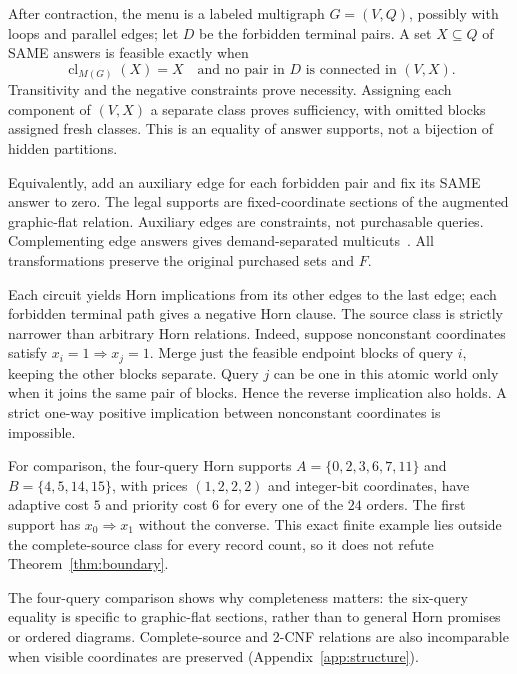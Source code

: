 \documentclass[pdflatex,sn-mathphys-num]{sn-jnl}
\newcommand{\cl}{\operatorname{cl}}
\theoremstyle{thmstyleone}
\theoremstyle{thmstylethree}
\theoremstyle{thmstyletwo}
\begin{document}
After contraction, the menu is a labeled multigraph $G=(V,Q)$, possibly with loops and parallel edges; let $D$ be the forbidden terminal pairs. A set $X\subseteq Q$ of SAME answers is feasible exactly when
\begin{equation}\label{eq:flat}
 \cl_{M(G)}(X)=X
 \quad\text{and no pair in }D\text{ is connected in }(V,X).
\end{equation}
Transitivity and the negative constraints prove necessity. Assigning each component of $(V,X)$ a separate class proves sufficiency, with omitted blocks assigned fresh classes. This is an equality of answer supports, not a bijection of hidden partitions.

Equivalently, add an auxiliary edge for each forbidden pair and fix its SAME answer to zero. The legal supports are fixed-coordinate sections of the augmented graphic-flat relation. Auxiliary edges are constraints, not purchasable queries. Complementing edge answers gives demand-separated multicuts~\cite{berczi,hornakova}. All transformations preserve the original purchased sets and $F$.

Each circuit yields Horn implications from its other edges to the last edge; each forbidden terminal path gives a negative Horn clause. The source class is strictly narrower than arbitrary Horn relations. Indeed, suppose nonconstant coordinates satisfy $x_i=1\Rightarrow x_j=1$. Merge just the feasible endpoint blocks of query $i$, keeping the other blocks separate. Query $j$ can be one in this atomic world only when it joins the same pair of blocks. Hence the reverse implication also holds. A strict one-way positive implication between nonconstant coordinates is impossible.

For comparison, the four-query Horn supports $A=\{0,2,3,6,7,11\}$ and $B=\{4,5,14,15\}$, with prices $(1,2,2,2)$ and integer-bit coordinates, have adaptive cost $5$ and priority cost $6$ for every one of the $24$ orders. The first support has $x_0\Rightarrow x_1$ without the converse. This exact finite example lies outside the complete-source class for every record count, so it does not refute Theorem~\ref{thm:boundary}.

The four-query comparison shows why completeness matters: the six-query equality is specific to graphic-flat sections, rather than to general Horn promises or ordered diagrams. Complete-source and 2-CNF relations are also incomparable when visible coordinates are preserved (Appendix~\ref{app:structure}).
\end{document}
